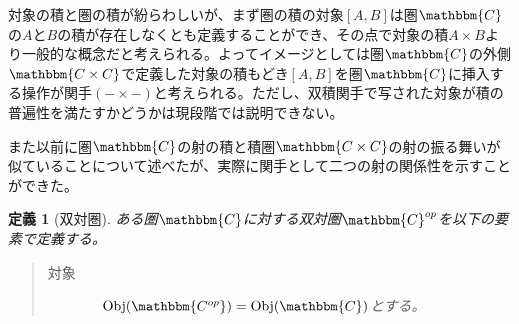 \documentclass[uplatex,dvipdfmx]{jsarticle}
\newcommand{\cat}[1]{\mathbbm{#1}}
\newcommand{\obj}[1]{\mathrm{Obj}(\cat{#1})}
\newcommand{\pcobj}[1]{[#1]}
\newtheorem{define}{定義}[section]
\numberwithin{proof}{subsection}
\numberwithin{prop}{subsection}
\numberwithin{define}{subsection}
\begin{document}
	対象の積と圏の積が紛らわしいが、まず圏の積の対象$\pcobj{A,B}$は圏$\cat{C}$の$A$と$B$の積が存在しなくとも定義することができ、その点で対象の積$A\times B$より一般的な概念だと考えられる。よってイメージとしては圏$\cat{C}$の外側$\cat{C\times C}$で定義した対象の積もどき$[A,B]$を圏$\cat{C}$に挿入する操作が関手$(-\times-)$と考えられる。ただし、双積関手で写された対象が積の普遍性を満たすかどうかは現段階では説明できない。

	また以前に圏$\cat{C}$の射の積と積圏$\cat{C\times C}$の射の振る舞いが似ていることについて述べたが、実際に関手として二つの射の関係性を示すことができた。
	\begin{define}[双対圏]
		ある圏$\cat{C}$に対する双対圏$\cat{C}^{op}$を以下の要素で定義する。
		\begin{quote}
			\begin{description}
				\item[対象]　$\obj{C^{op}}=\obj{C}$とする。


\end{description}
\end{quote}
\end{define}
\end{document}
